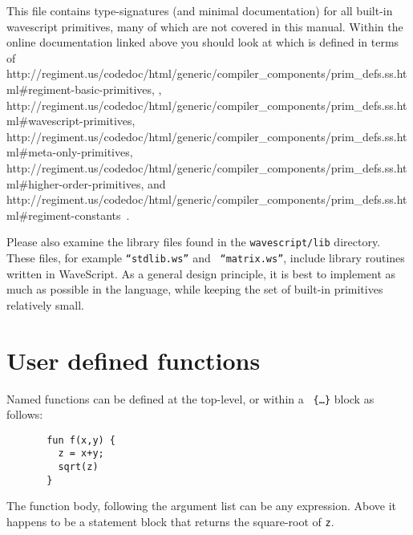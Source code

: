 \documentclass[twocolumn]{report}
\begin{document}
This file contains type-signatures (and minimal documentation) for all built-in
wavescript primitives, many of which are not covered in this manual.
Within the online documentation linked above you should look at 
which is defined in terms of 
      {http://regiment.us/codedoc/html/generic/compiler\_components/prim\_defs.ss.html\#regiment-basic-primitives},
,
          {http://regiment.us/codedoc/html/generic/compiler\_components/prim\_defs.ss.html\#wavescript-primitives},
           {http://regiment.us/codedoc/html/generic/compiler\_components/prim\_defs.ss.html\#meta-only-primitives},
        {http://regiment.us/codedoc/html/generic/compiler\_components/prim\_defs.ss.html\#higher-order-primitives},
and
             {http://regiment.us/codedoc/html/generic/compiler\_components/prim\_defs.ss.html\#regiment-constants}~.

Please also examine the library files found in the {\tt wavescript/lib}
directory.  These files, for example {\tt ``stdlib.ws''} and {\tt
  ``matrix.ws''}, include library routines written in WaveScript.  As
a general design principle, it is best to implement as much as
possible in the language, while keeping the set of built-in primitives
relatively small.


\section{User defined functions}
\label{udfs}

Named functions can be defined at the top-level, or within a {\tt
  \{\ldots\}} block as follows:

\begin{verbatim}
       fun f(x,y) {
         z = x+y;
         sqrt(z)
       }
\end{verbatim}

The function body, following the argument list can be any expression.
Above it happens to be a statement block that returns the
square-root of {\tt z}.
\end{document}
